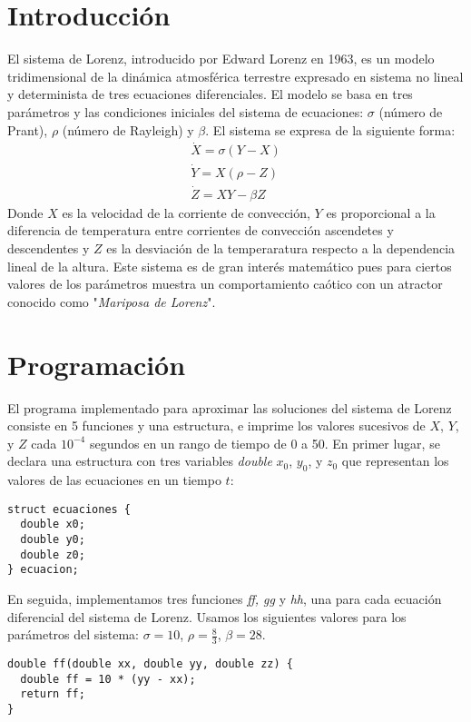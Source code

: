 \documentclass[letterpaper, 12pt]{article}
\begin{document}
{\section*{Introducci\'on}

\justify
El sistema de Lorenz, introducido por Edward Lorenz en 1963, es un modelo tridimensional de la din\'amica atmosf\'erica terrestre expresado en sistema no lineal y determinista de tres ecuaciones diferenciales. El modelo se basa en tres par\'ametros y las condiciones iniciales del sistema de ecuaciones: $\sigma$ (número de Prant), $\rho$ (número de Rayleigh) y $\beta$.
El sistema se expresa de la siguiente forma:
\begin{align}
\dot{X} = \sigma (Y-X)\\
\dot{Y} = X(\rho - Z)\\
\dot{Z} = XY - \beta Z
\end{align}
Donde $X$ es la velocidad de la corriente de convecci\'on, $Y$ es proporcional a la diferencia de temperatura entre  corrientes de convecci\'on ascendetes y descendentes y $Z$ es la desviaci\'on de la temperaratura respecto a la dependencia lineal de la altura. Este sistema es de gran inter\'es matem\'atico pues para ciertos valores de los par\'ametros muestra un comportamiento ca\'otico con un atractor conocido como "\textit{Mariposa de Lorenz}". 


\section*{Programaci\'on}

\justify
El programa implementado para aproximar las soluciones del sistema de Lorenz consiste en 5 funciones y una estructura, e imprime los valores sucesivos de $X$, $Y$, y $Z$ cada $10^{-4}$ segundos en un rango de tiempo de 0 a 50. En primer lugar, se declara una estructura con tres variables \textit{double} $x_0$, $y_0$, y $z_0$ que representan los valores de las ecuaciones en un tiempo $t$:

\begin{lstlisting}
struct ecuaciones {
  double x0;
  double y0;
  double z0;
} ecuacion;
\end{lstlisting}
 En seguida, implementamos tres funciones \textit{ff, gg} y \textit{hh}, una para cada ecuaci\'on diferencial del sistema de Lorenz. Usamos los siguientes valores para los par\'ametros del sistema: $\sigma = 10$, $\rho = \frac{8}{3}$, $\beta = 28$. 
\begin{lstlisting}
double ff(double xx, double yy, double zz) {
  double ff = 10 * (yy - xx);
  return ff;
}


\end{lstlisting}}
\end{document}
